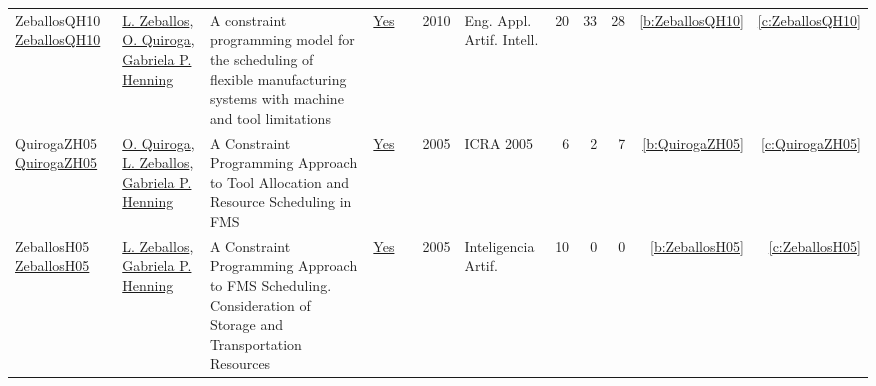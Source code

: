 {\begin{longtable}{>{\raggedright\arraybackslash}p{3cm}>{\raggedright\arraybackslash}p{6cm}>{\raggedright\arraybackslash}p{6.5cm}rrrp{2.5cm}rrrrr}
ZeballosQH10 \href{https://doi.org/10.1016/j.engappai.2009.07.002}{ZeballosQH10} & \hyperref[auth:a631]{L. Zeballos}, \hyperref[auth:a632]{O. Quiroga}, \hyperref[auth:a598]{Gabriela P. Henning} & A constraint programming model for the scheduling of flexible manufacturing systems with machine and tool limitations & \href{works/ZeballosQH10.pdf}{Yes} & \cite{ZeballosQH10} & 2010 & Eng. Appl. Artif. Intell. & 20 & 33 & 28 & \ref{b:ZeballosQH10} & \ref{c:ZeballosQH10}\\
QuirogaZH05 \href{https://doi.org/10.1109/ROBOT.2005.1570686}{QuirogaZH05} & \hyperref[auth:a632]{O. Quiroga}, \hyperref[auth:a631]{L. Zeballos}, \hyperref[auth:a598]{Gabriela P. Henning} & A Constraint Programming Approach to Tool Allocation and Resource Scheduling in {FMS} & \href{works/QuirogaZH05.pdf}{Yes} & \cite{QuirogaZH05} & 2005 & ICRA 2005 & 6 & 2 & 7 & \ref{b:QuirogaZH05} & \ref{c:QuirogaZH05}\\
ZeballosH05 \href{http://journal.iberamia.org/index.php/ia/article/view/452/article\%20\%281\%29.pdf}{ZeballosH05} & \hyperref[auth:a631]{L. Zeballos}, \hyperref[auth:a598]{Gabriela P. Henning} & A Constraint Programming Approach to {FMS} Scheduling. Consideration of Storage and Transportation Resources & \href{works/ZeballosH05.pdf}{Yes} & \cite{ZeballosH05} & 2005 & Inteligencia Artif. & 10 & 0 & 0 & \ref{b:ZeballosH05} & \ref{c:ZeballosH05}\\
\end{longtable}
}

